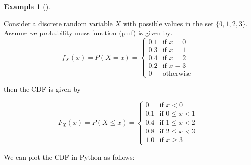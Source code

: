 \documentclass[
  letterpaper,
  DIV=11,
  numbers=noendperiod]{scrreport}
\theoremstyle{definition}
\newtheorem{example}{Example}[chapter]
\theoremstyle{plain}
\theoremstyle{definition}
\theoremstyle{plain}
\theoremstyle{remark}
\begin{document}
\begin{tcolorbox}[enhanced jigsaw, breakable, opacityback=0, leftrule=.75mm, colback=white, bottomtitle=1mm, coltitle=black, toptitle=1mm, titlerule=0mm, bottomrule=.15mm, colframe=quarto-callout-note-color-frame, title={CDF of a discrete random variable}, opacitybacktitle=0.6, colbacktitle=quarto-callout-note-color!10!white, rightrule=.15mm, arc=.35mm, toprule=.15mm, left=2mm]

\begin{example}[]\protect\hypertarget{exm-cdf-discrete}{}\label{exm-cdf-discrete}

Consider a discrete random variable \(X\) with possible values in the
set \(\{0, 1, 2, 3\}\). Assume we probability mass function (pmf) is
given by: \[
f_X(x) = P(X=x) =
\begin{cases}
0.1 & \text{if } x = 0 \\
0.3 & \text{if } x = 1 \\
0.4 & \text{if } x = 2 \\
0.2 & \text{if } x = 3 \\
0 & \text{otherwise}
\end{cases}
\]

then the CDF is given by

\[
F_X(x) = P(X \le x) = 
\begin{cases}
0 & \text{if } x < 0 \\
0.1 & \text{if } 0 \le x < 1 \\
0.4 & \text{if } 1 \le x < 2 \\
0.8 & \text{if } 2 \le x < 3 \\
1.0 & \text{if } x \ge 3
\end{cases}
\]

\end{example}

\end{tcolorbox}

We can plot the CDF in Python as follows:
\end{document}
